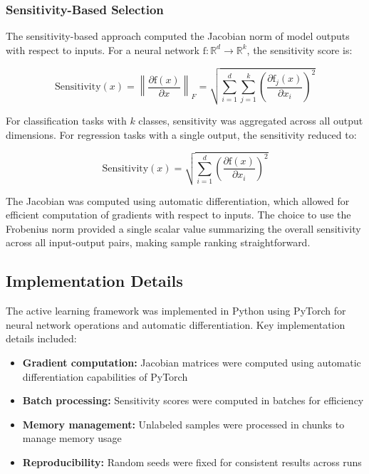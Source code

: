 \documentclass[conference]{IEEEtran}
\newcommand{\func}[1]{\mathrm{#1}} %
\begin{document}
\subsubsection{Sensitivity-Based Selection}

The sensitivity-based approach computed the Jacobian norm of model outputs with respect to inputs. For a neural network $\func{f}: \mathbb{R}^d \rightarrow \mathbb{R}^k$, the sensitivity score is:

\begin{equation}
\text{Sensitivity}(x) = \left\|\frac{\partial \func{f}(x)}{\partial x}\right\|_F = \sqrt{\sum_{i=1}^d \sum_{j=1}^k \left(\frac{\partial \func{f}_j(x)}{\partial x_i}\right)^2}
\end{equation}

For classification tasks with $k$ classes, sensitivity was aggregated across all output dimensions. For regression tasks with a single output, the sensitivity reduced to:

\begin{equation}
\text{Sensitivity}(x) = \sqrt{\sum_{i=1}^d \left(\frac{\partial \func{f}(x)}{\partial x_i}\right)^2}
\end{equation}

The Jacobian was computed using automatic differentiation, which allowed for efficient computation of gradients with respect to inputs. The choice to use the Frobenius norm provided a single scalar value summarizing the overall sensitivity across all input-output pairs, making sample ranking straightforward.

\subsection{Implementation Details}

The active learning framework was implemented in Python using PyTorch for neural network operations and automatic differentiation. Key implementation details included:

\begin{itemize}
\item \textbf{Gradient computation:} Jacobian matrices were computed using automatic differentiation capabilities of PyTorch
\item \textbf{Batch processing:} Sensitivity scores were computed in batches for efficiency
\item \textbf{Memory management:} Unlabeled samples were processed in chunks to manage memory usage
\item \textbf{Reproducibility:} Random seeds were fixed for consistent results across runs
\end{itemize}
\end{document}

